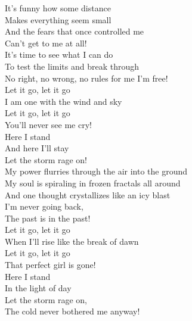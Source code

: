 \documentclass[letterpaper,10pt]{article}
\begin{document}
\begin{paracol}{2}
It's funny how some distance\\
Makes everything seem small\\
And the fears that once controlled me\\
Can't get to me at all!\\

It's time to see what I can do\\
To test the limits and break through\\
No right, no wrong, no rules for me I'm free!\\

Let it go, let it go\\
I am one with the wind and sky\\
Let it go, let it go\\
You'll never see me cry!\\

Here I stand\\
And here I'll stay\\
Let the storm rage on!\\

My power flurries through the air into the ground\\
My soul is spiraling in frozen fractals all around\\
And one thought crystallizes like an icy blast\\
I'm never going back,\\
The past is in the past!\\

Let it go, let it go\\
When I'll rise like the break of dawn\\
Let it go, let it go\\
That perfect girl is gone!\\

Here I stand\\
In the light of day\\
Let the storm rage on,\\
The cold never bothered me anyway!\\

\end{paracol}
\end{document}

